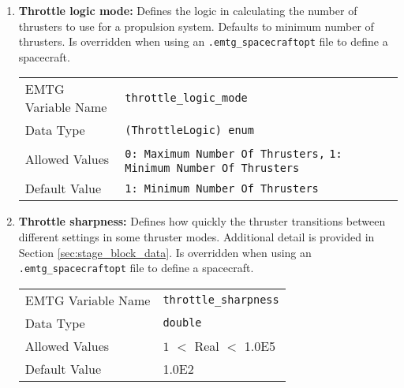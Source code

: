 \begin{enumerate}
    \item \textbf{Throttle logic mode:} Defines the logic in calculating the number of thrusters to use for a propulsion system. Defaults to minimum number of thrusters. Is overridden when using an {\tt .emtg\_spacecraftopt} file to define a spacecraft.
    \begin{table}[H]
        \hspace{2cm}
        \begin{tabular}{lp{5cm}}
        \ac{EMTG} Variable Name & \verb|throttle_logic_mode| \\
        Data Type & \verb|(ThrottleLogic) enum| \\
        Allowed Values & \verb|0: Maximum Number Of Thrusters,| \newline
                        \verb|1: Minimum Number Of Thrusters| \\
        Default Value & \verb|1: Minimum Number Of Thrusters| \\
        \end{tabular}
    \end{table}
    
    
    \item \textbf{Throttle sharpness:} Defines how quickly the thruster transitions between different settings in some thruster modes. Additional detail is provided in Section \ref{sec:stage_block_data}. Is overridden when using an {\tt .emtg\_spacecraftopt} file to define a spacecraft.
    \begin{table}[H]
        \hspace{2cm}
        \begin{tabular}{lp{5cm}}
        \ac{EMTG} Variable Name & \verb|throttle_sharpness| \\
        Data Type & \verb|double| \\
        Allowed Values & $1$ $<$ Real $<$ 1.0E5 \\
        Default Value & 1.0E2 \\
        \end{tabular}
    \end{table}
    

\end{enumerate}
